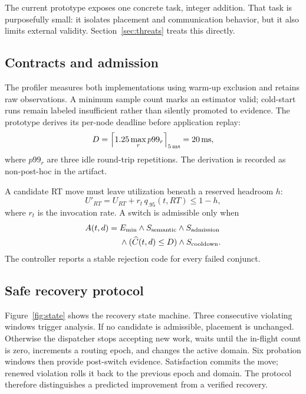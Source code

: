 \documentclass[conference]{IEEEtran}
\begin{document}
The current prototype exposes one concrete task, integer addition. That task is
purposefully small: it isolates placement and communication behavior, but it
also limits external validity. Section~\ref{sec:threats} treats this directly.

\subsection{Contracts and admission}
The profiler measures both implementations using warm-up exclusion and retains
raw observations. A minimum sample count marks an estimator valid; cold-start
runs remain labeled insufficient rather than silently promoted to evidence.
The prototype derives its per-node deadline before application replay:
\begin{equation}
 D=\left\lceil 1.25\max_r p99_r\right\rceil_{5\,\mathrm{ms}}
   = 20\,\mathrm{ms},
 \label{eq:deadline}
\end{equation}
where $p99_r$ are three idle round-trip repetitions. The derivation is recorded
as non-post-hoc in the artifact.

A candidate RT move must leave utilization beneath a reserved headroom $h$:
\begin{equation}
 U'_{RT}=U_{RT}+r_t\,q_{.95}(t,RT)\le 1-h,
 \label{eq:admission}
\end{equation}
where $r_t$ is the invocation rate. A switch is admissible only when
\begin{align}
 A(t,d)={}&E_{\min}\land S_{\mathrm{semantic}}\land
 S_{\mathrm{admission}} \notag\\
 &\land (\widehat C(t,d)\le D)\land S_{\mathrm{cooldown}}.
 \label{eq:admissible}
\end{align}
The controller reports a stable rejection code for every failed conjunct.

\subsection{Safe recovery protocol}
Figure~\ref{fig:state} shows the recovery state machine. Three consecutive
violating windows trigger analysis. If no candidate is admissible, placement is
unchanged. Otherwise the dispatcher stops accepting new work, waits until the
in-flight count is zero, increments a routing epoch, and changes the active
domain. Six probation windows then provide post-switch evidence. Satisfaction
commits the move; renewed violation rolls it back to the previous epoch and
domain. The protocol therefore distinguishes a predicted improvement from a
verified recovery.
\end{document}
